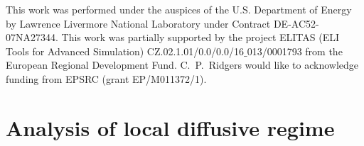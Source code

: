 \documentclass[
 aps,
 jmp,
 amsmath,amssymb,
 twocolumn,
]{revtex4-1}
\begin{document}
\begin{acknowledgments}
This work was performed under the auspices of the U.S. Department of Energy by Lawrence Livermore National Laboratory under Contract DE-AC52-07NA27344.
This work was partially supported by the project ELITAS (ELI Tools for Advanced Simulation) CZ.02.1.01/0.0/0.0/16$\_$013/0001793 from the European Regional Development Fund.
C.~P.~Ridgers would like to acknowledge funding from EPSRC (grant EP/M011372/1). 

 %
\end{acknowledgments}

\appendix
\section{Analysis of local diffusive regime}
\label{app:DiffusiveKinetics}
\end{document}
